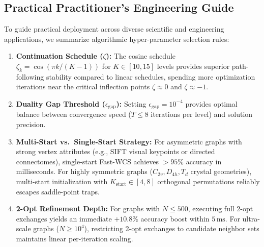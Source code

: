 \documentclass[a4paper,fleqn]{cas-dc}
\theoremstyle{thmstyleone}
\theoremstyle{thmstyletwo}
\theoremstyle{thmstylethree}
\begin{document}
\subsection{Practical Practitioner's Engineering Guide}
To guide practical deployment across diverse scientific and engineering applications, we summarize algorithmic hyper-parameter selection rules:
\begin{enumerate}
    \item \textbf{Continuation Schedule ($\zeta$):} The cosine schedule $\zeta_k = \cos(\pi k / (K-1))$ for $K \in [10, 15]$ levels provides superior path-following stability compared to linear schedules, spending more optimization iterations near the critical inflection points $\zeta \approx 0$ and $\zeta \approx -1$.
    \item \textbf{Duality Gap Threshold ($\epsilon_{\text{gap}}$):} Setting $\epsilon_{\text{gap}} = 10^{-4}$ provides optimal balance between convergence speed ($T \le 8$ iterations per level) and solution precision.
    \item \textbf{Multi-Start vs.\ Single-Start Strategy:} For asymmetric graphs with strong vertex attributes (e.g., SIFT visual keypoints or directed connectomes), single-start Fast-WCS achieves $>95\%$ accuracy in milliseconds. For highly symmetric graphs ($C_{2v}, D_{4h}, T_d$ crystal geometries), multi-start initialization with $K_{\text{start}} \in [4, 8]$ orthogonal permutations reliably escapes saddle-point traps.
    \item \textbf{2-Opt Refinement Depth:} For graphs with $N \le 500$, executing full 2-opt exchanges yields an immediate $+10.8\%$ accuracy boost within $5\,\text{ms}$. For ultra-scale graphs ($N \ge 10^4$), restricting 2-opt exchanges to candidate neighbor sets maintains linear per-iteration scaling.
\end{enumerate}
\end{document}
